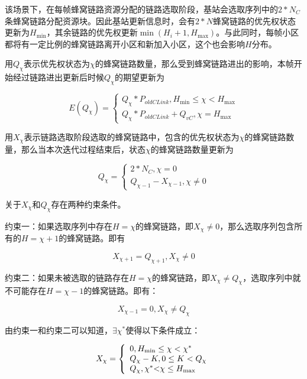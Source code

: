 \documentclass[figurelist,tablelist,algorithmlist,nomlist,masters]{seuthesix}
\begin{document}
	该场景下，在每帧蜂窝链路资源分配的链路选取阶段，基站会选取序列中的$2*N_C$条蜂窝链路分配资源块。因此基站更新信息时，会有$2*N$蜂窝链路的优先权状态更新为${H_{\min }}$，其余链路的优先权更新$\min ({H_i} + 1,{H_{\max }})$。与此同时，每帧小区都将有一定比例的蜂窝链路离开小区和新加入小区，这个也会影响${H}$分布。
	
	
	用$Q_{\chi }$表示优先权状态为$\chi $的蜂窝链路数量，那么受到蜂窝链路进出的影响，本帧开始经过链路进出更新后时候$Q_{\chi }$的期望更新为
	
	\begin{equation}\label{eq3.1}
	E(Q_{\chi }) = \left\{ \begin{array}{l}
	Q_{\chi }*{P_{oldCLink}},{H_{\min }} \le \chi  < {H_{\max }}\\
	Q_{\chi }*{P_{oldCLink}} + Q_{vC},{\chi } = {H_{\max }}
	\end{array} \right.
	\end{equation}
	
	用$X_{\chi }$表示链路选取阶段选取的蜂窝链路中，包含的优先权状态为$\chi $的蜂窝链路数量，那么当本次迭代过程结束后，状态$\chi $的蜂窝链路数量更新为
	
	\begin{equation}\label{eq3.1}
	Q_\chi  = \left\{ \begin{array}{l}
	2*N_C,\chi  = 0\\
	Q_{\chi  - 1} - X_{\chi - 1},\chi \ne 0
	\end{array} \right.
	\end{equation}
	
	关于$X_{\chi }$和$Q_{\chi }$存在两种约束条件。
	
	约束一：如果选取序列中存在$H = \chi $的蜂窝链路，即$X_\chi \ne 0$，那么选取序列包含所有的$H = \chi + 1$的蜂窝链路。即有
	
	\begin{equation}\label{eq3.1}
	X_{\chi  + 1} = Q_{\chi  + 1},X_\chi \ne 0
	\end{equation}
	
	
	约束二：如果未被选取的链路存在$H = \chi $的蜂窝链路，即$X_{\chi } \ne Q_{\chi }$，选取序列中就不可能存在$H = \chi - 1$的蜂窝链路。即有：
	
	\begin{equation}\label{eq3.1}
	X_{\chi  - 1} = 0,X_{\chi } \ne Q_{\chi }
	\end{equation}
	
	由约束一和约束二可以知道，$\exists \chi ^*$使得以下条件成立：
	
	
	\begin{equation}\label{eq3.1}
	{X_\chi } = \left\{ \begin{array}{l}
	0,{H_{\min }} \le \chi  < {\chi ^*}\\
	{Q_\chi } - K,0 \le K < {Q_\chi }\\
	{Q_\chi },{\chi ^*}{\rm{ <  }}\chi  \le {H_{\max }}
	\end{array} \right.
	\end{equation}
	
\end{document}
